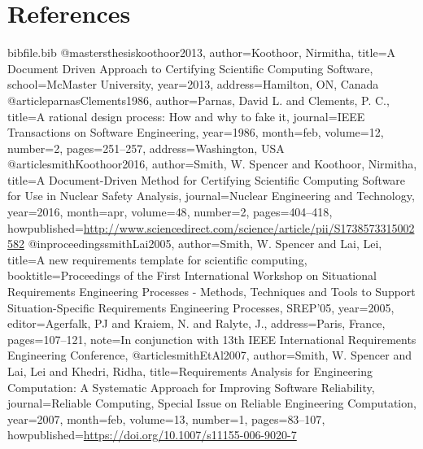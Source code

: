 \documentclass[12pt]{article}
\begin{document}
\section{References}
\label{Sec:References}
\begin{filecontents*}{bibfile.bib}
@mastersthesis{koothoor2013,
author={Koothoor, Nirmitha},
title={A Document Driven Approach to Certifying Scientific Computing Software},
school={McMaster University},
year={2013},
address={Hamilton, ON, Canada}}
@article{parnasClements1986,
author={Parnas, David L. and Clements, P. C.},
title={A rational design process: How and why to fake it},
journal={IEEE Transactions on Software Engineering},
year={1986},
month=feb,
volume={12},
number={2},
pages={251--257},
address={Washington, USA}}
@article{smithKoothoor2016,
author={Smith, W. Spencer and Koothoor, Nirmitha},
title={A Document-Driven Method for Certifying Scientific Computing Software for Use in Nuclear Safety Analysis},
journal={Nuclear Engineering and Technology},
year={2016},
month=apr,
volume={48},
number={2},
pages={404--418},
howpublished={\url{http://www.sciencedirect.com/science/article/pii/S1738573315002582}}}
@inproceedings{smithLai2005,
author={Smith, W. Spencer and Lai, Lei},
title={A new requirements template for scientific computing},
booktitle={Proceedings of the First International Workshop on Situational Requirements Engineering Processes - Methods, Techniques and Tools to Support Situation-Specific Requirements Engineering Processes, SREP'05},
year={2005},
editor={Agerfalk, PJ and Kraiem, N. and Ralyte, J.},
address={Paris, France},
pages={107--121},
note={In conjunction with 13th IEEE International Requirements Engineering Conference,}}
@article{smithEtAl2007,
author={Smith, W. Spencer and Lai, Lei and Khedri, Ridha},
title={Requirements Analysis for Engineering Computation: A Systematic Approach for Improving Software Reliability},
journal={Reliable Computing, Special Issue on Reliable Engineering Computation},
year={2007},
month=feb,
volume={13},
number={1},
pages={83--107},
howpublished={\url{https://doi.org/10.1007/s11155-006-9020-7}}}
\end{filecontents*}
\nocite{*}
\printbibliography[heading=none]
\end{document}

